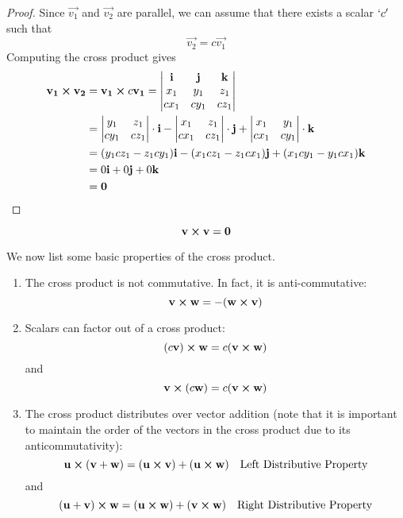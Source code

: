 \documentclass[handout]{ximera}
\begin{document}
\begin{proof}
Since $\vec{v_1}$ and $\vec{v_2}$ are parallel, we can assume that there exists a scalar $`c'$ such that 
\[
\vec{v_2} = c\vec{v_1}
\]
Computing the cross product gives
\begin{align*}
\mathbf{v_1} \boldsymbol\times \mathbf{v_2} &= \mathbf{v_1} \boldsymbol\times c\mathbf{v_1}
                         =  \begin{vmatrix}
                                  \mathbf{i} & \mathbf{j} & \mathbf{k}\\
                                      x_1 & y_1 & z_1\\
                                       cx_1 & cy_1 & cz_1
                            \end{vmatrix} \\
&= \begin{vmatrix}
 y_1 & z_1  \\
 cy_1 & cz_1 \\
 \end{vmatrix} \cdot \mathbf i
 - \begin{vmatrix}
 x_1 & z_1  \\
 cx_1 & cz_1 \\
 \end{vmatrix} \cdot \mathbf j
 + \begin{vmatrix}
 x_1 & y_1  \\
 cx_1 & cy_1 \\
 \end{vmatrix} \cdot \mathbf k\\
 &= (y_1cz_1 - z_1cy_1) \mathbf{i} - (x_1cz_1-z_1cx_1) \mathbf{j} + (x_1cy_1 - y_1cx_1) \mathbf{k}\\
 &=0 \mathbf{i} + 0 \mathbf{j} + 0 \mathbf{k}\\
 &= \mathbf 0
 \end{align*}
 \end{proof}

\begin{corollary}
\[
\mathbf v \boldsymbol\times \mathbf v = \mathbf 0
\]
\end{corollary}

We now list some basic properties of the cross product.\\

\begin{enumerate}
\item The cross product is not commutative.  In fact, it is anti-commutative:
\[
\mathbf{v} \boldsymbol\times \mathbf{w} = -(\mathbf{w} \boldsymbol\times \mathbf{v})
\]
\item Scalars can factor out of a cross product:
\[
(c\mathbf{v}) \boldsymbol\times \mathbf{w} = c(\mathbf{v} \boldsymbol\times \mathbf{w})
\]
and
\[
\mathbf{v} \boldsymbol\times (c\mathbf{w}) = c(\mathbf{v} \boldsymbol\times \mathbf{w})
\]
\item The cross product distributes over vector addition 
(note that it is important to maintain the order of the vectors in the cross product due to its anticommutativity):
\[
\mathbf{u} \boldsymbol\times (\mathbf{v} + \mathbf{w}) = (\mathbf{u} \boldsymbol\times \mathbf{v}) + (\mathbf{u} \boldsymbol\times \mathbf{w})\quad \text{Left Distributive Property}
\]
and
\[
(\mathbf{u} + \mathbf{v}) \boldsymbol\times \mathbf{w} = (\mathbf{u} \boldsymbol\times \mathbf{w}) + (\mathbf{v} \boldsymbol\times \mathbf{w})\quad \text{Right Distributive Property}
\]
\end{enumerate}
\end{document}

